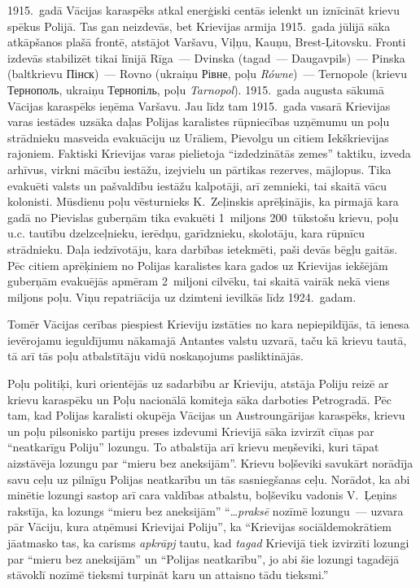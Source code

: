 \documentclass[twoside,a5paper,12pt,fleqn,openany]{extbook}
\newcommand{\pltxti}[1]{\textit{\textpolish{#1}}}
\newcommand{\rutxti}[1]{\textrussian{#1}}
\newcommand{\uktxti}[1]{\textukrainian{#1}}
\begin{document}
1915.~gadā Vācijas karaspēks atkal enerģiski centās ielenkt un iznīcināt krievu spēkus Polijā. Tas gan neizdevās, bet Krievijas armija 1915.~gada jūlijā sāka atkāpšanos plašā frontē, atstājot Varšavu, Viļņu, Kauņu, Brest-Ļitovsku. Fronti izdevās stabilizēt tikai līnijā Rīga~--- Dvinska (tagad~--- Daugavpils)~--- Pinska (baltkrievu \rutxti{Пінск})~--- Rovno (ukraiņu \uktxti{Рівне}, poļu \pltxti{Równe})~--- Ternopole (krievu \rutxti{Тернополь}, ukraiņu \uktxti{Тернопіль}, poļu \pltxti{Tarnopol}). 1915.~gada augusta sākumā Vācijas karaspēks ieņēma Varšavu. Jau līdz tam 1915.~gada vasarā Krievijas varas iestādes uzsāka daļas Polijas karalistes rūpniecības uzņēmumu un poļu strādnieku masveida evakuāciju uz Urāliem, Pievolgu un citiem Iekškrievijas rajoniem. Faktiski Krievijas varas pielietoja ``izdedzinātās zemes'' taktiku, izveda arhīvus, virkni mācību iestāžu, izejvielu un pārtikas rezerves, mājlopus. Tika evakuēti valsts un pašvaldību iestāžu kalpotāji, arī zemnieki, tai skaitā vācu kolonisti. Mūsdienu poļu vēsturnieks K.~Zeļinskis aprēķinājis, ka pirmajā kara gadā no Pievislas guberņām tika evakuēti 1~miljons 200~tūkstošu krievu, poļu u.c. tautību dzelzceļnieku, ierēdņu, garīdznieku, skolotāju, kara rūpnīcu strādnieku. Daļa iedzīvotāju, kara darbības ietekmēti, paši devās bēgļu gaitās. Pēc citiem aprēķiniem no Polijas karalistes kara gados uz Krievijas iekšējām guberņām evakuējās apmēram 2~miljoni cilvēku, tai skaitā vairāk nekā viens miljons poļu. Viņu repatriācija uz dzimteni ievilkās līdz 1924.~gadam.

Tomēr Vācijas cerības piespiest Krieviju izstāties no kara nepiepildījās, tā ienesa ievērojamu ieguldījumu nākamajā Antantes valstu uzvarā, taču kā krievu tautā, tā arī tās poļu atbalstītāju vidū noskaņojums pasliktinājās.

Poļu politiķi, kuri orientējās uz sadarbību ar Krieviju, atstāja Poliju reizē ar krievu karaspēku un Poļu nacionālā komiteja sāka darboties Petrogradā. Pēc tam, kad Polijas karalisti okupēja Vācijas un Austroungārijas karaspēks, krievu un poļu pilsonisko partiju preses izdevumi Krievijā sāka izvirzīt cīņas par ``neatkarīgu Poliju'' lozungu. To atbalstīja arī krievu meņševiki, kuri tāpat aizstāvēja lozungu par ``mieru bez aneksijām''. Krievu boļševiki savukārt norādīja savu ceļu uz pilnīgu Polijas neatkarību un tās sasniegšanas ceļu. Norādot, ka abi minētie lozungi sastop arī cara valdības atbalstu, boļševiku vadonis V.~Ļeņins rakstīja, ka lozungs ``mieru bez aneksijām'' ``\dots{}\emph{praksē} nozīmē lozungu~--- uzvara pār Vāciju, kura atņēmusi Krievijai Poliju'', ka ``Krievijas sociāldemokrātiem jāatmasko tas, ka carisms \emph{apkrāpj} tautu, kad \emph{tagad} Krievijā tiek izvirzīti lozungi par ``mieru bez aneksijām'' un ``Polijas neatkarību'', jo abi šie lozungi tagadējā stāvoklī nozīmē tieksmi turpināt karu un attaisno tādu tieksmi.''
\end{document}
